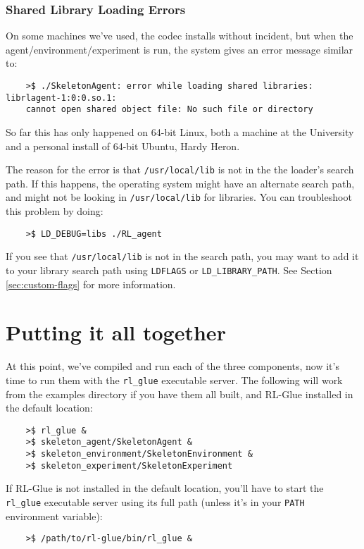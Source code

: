 \documentclass[11pt]{article}
\begin{document}
\subsubsection{Shared Library Loading Errors}
\label{sec:gotchas-shared-libs}
On some machines we've used, the codec installs without incident, but when the agent/environment/experiment is run, the system gives an error message similar to:
\begin{verbatim}
	>$ ./SkeletonAgent: error while loading shared libraries: librlagent-1:0:0.so.1:
	cannot open shared object file: No such file or directory
\end{verbatim}

So far this has only happened on 64-bit Linux, both a machine at the University
and a personal install of 64-bit Ubuntu, Hardy Heron.

The reason for the error is that \texttt{/usr/local/lib} is not in the the loader's search path.  If this happens, the operating system might have an alternate search path, and might not be looking in \texttt{/usr/local/lib} for libraries. 
You can troubleshoot this problem by doing:
\begin{verbatim}
	>$ LD_DEBUG=libs ./RL_agent
\end{verbatim}
If you see that \texttt{/usr/local/lib} is not in the search path, you may want to add it to your library search path using \texttt{LDFLAGS} or \texttt{LD\_LIBRARY\_PATH}.  See Section \ref{sec:custom-flags} for more information.  

\section{Putting it all together}
At this point, we've compiled and run each of the three components, now it's time to run them with the \texttt{rl\_glue} executable server.  The following will work from the examples directory if you have them all built, and RL-Glue installed in the default location:
\begin{verbatim}
	>$ rl_glue &
	>$ skeleton_agent/SkeletonAgent &
	>$ skeleton_environment/SkeletonEnvironment &
	>$ skeleton_experiment/SkeletonExperiment	
\end{verbatim}

If RL-Glue is not installed in the default location, you'll have to start the \texttt{rl\_glue} executable server using its full path (unless it's in your \texttt{PATH} environment variable):
\begin{verbatim}
	>$ /path/to/rl-glue/bin/rl_glue &
\end{verbatim}
\end{document}
